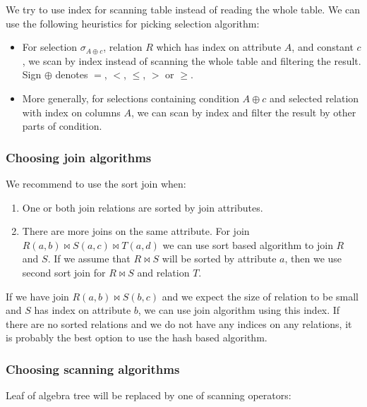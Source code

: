 We try to use index for scanning table instead of reading the whole table. We can use the following heuristics for picking selection algorithm: 
\begin{itemize}
\item For selection $\sigma_{A\oplus c}$, relation $R$ which has index on attribute $A$, and constant $c$, we scan by index instead of scanning the whole table and filtering the result. Sign $\oplus$ denotes $=$, $<$, $\leq$, $>$ or $\geq$.
\item More generally, for selections containing condition $A\oplus c$ and selected relation with index on columns $A$, we can scan by index and filter the result by other parts of condition.
\end{itemize}

\subsubsection{Choosing join algorithms}

We recommend to use the sort join when:

\begin{enumerate}
\item One or both join relations are sorted by join attributes.
\item There are more joins on the same attribute. For join $R(a,b)\Join S(a,c) \Join T(a,d)$ we can use  sort based algorithm to join $R$ and $S$. If we assume that $R \Join S$ will be sorted by attribute $a$, then we use second sort join for $R\Join S$ and relation $T$.

\end{enumerate}

If we have join $R(a,b)\Join S(b,c)$ and we expect the size of relation to be small and $S$ has index on attribute $b$, we can use join algorithm using this index.
If there are no sorted relations and we do not have any indices on any relations, it is probably the best option to use the hash based algorithm.

\subsubsection{Choosing scanning algorithms}

Leaf of algebra tree will be replaced by one of scanning operators:

